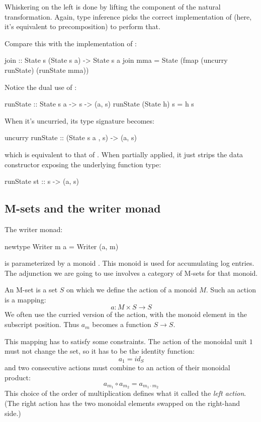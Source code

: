 \documentclass[DaoFP]{subfiles}
\begin{document}
Whiskering on the left is done by lifting the component of the natural transformation. Again, type inference picks the correct implementation of  (here, it's equivalent to precomposition) to perform that.

Compare this with the implementation of :
\begin{haskell}
join :: State s (State s a) -> State s a
join mma = State (fmap (uncurry runState) (runState mma))
\end{haskell}
Notice the dual use of : 
\begin{haskell}
runState :: State s a -> s -> (a, s)
runState (State h) s = h s
\end{haskell}
When it's uncurried, its type signature becomes:
\begin{haskell}
uncurry runState :: (State s a , s) -> (a, s)
\end{haskell}
which is equivalent to that of . When partially applied, it just strips the data constructor exposing the underlying function type:
\begin{haskell}
runState st ::  s -> (a, s)
\end{haskell}



\subsection{M-sets and the writer monad}

The writer monad:
\begin{haskell}
newtype Writer m a = Writer (a, m)
\end{haskell}
is parameterized by a monoid . This monoid is used for accumulating log entries. The adjunction we are going to use involves a category of M-sets for that monoid. 

An M-set is a set $S$ on which we define the action of a monoid $M$. Such an action is a mapping:
\[a \colon M \times S \to S \]
We often use the curried version of the action, with the monoid element in the subscript position. Thus $a_m$ becomes a function $S \to S$. 

This mapping has to satisfy some constraints. The action of the monoidal unit $1$ must not change the set, so it has to be the identity function:
\[ a_1 = id_S \]
and two consecutive actions must combine to an action of their monoidal product:
\[ a_{m_1} \circ a_{m_2} = a_{m_1 \cdot m_2} \]
This choice of the order of multiplication defines what it called the \emph{left action}. (The right action has the two monoidal elements swapped on the right-hand side.)
\end{document}
